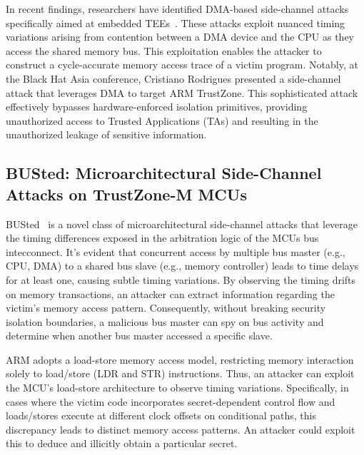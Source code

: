 In recent findings, researchers have identified DMA-based side-channel
attacks specifically aimed at embedded TEEs~\cite{busted, marton}. These
attacks exploit nuanced timing variations arising from contention between a
DMA device and the CPU as they access the shared memory bus. This
exploitation enables the attacker to construct a cycle-accurate memory
access trace of a victim program. Notably, at the Black Hat Asia
conference, Cristiano Rodrigues presented a side-channel attack that
leverages DMA to target ARM TrustZone. This sophisticated attack
effectively bypasses hardware-enforced isolation primitives, providing
unauthorized access to Trusted Applications (\acp{TA}) and resulting in the
unauthorized leakage of sensitive information.

\subsection{BUSted: Microarchitectural Side-Channel Attacks on TrustZone-M MCUs}

BUSted~\cite{busted} is a novel class of microarchitectural side-channel
attacks that leverage the timing differences exposed in the arbitration
logic of the MCUs bus intecconnect. It's evident that concurrent access by
multiple bus master (e.g., CPU, DMA) to a shared bus slave (e.g., memory
controller) leads to time delays for at least one, causing subtle timing
variations. By observing the timing drifts on memory transactions, an
attacker can extract information regarding the victim’s memory access
pattern. Consequently, without breaking security isolation boundaries, a
malicious bus master can spy on bus activity and determine when another bus
master accessed a specific slave.

ARM adopts a load-store memory access model, restricting memory interaction solely to load/store (LDR and STR) instructions. Thus, an attacker can exploit the MCU's load-store architecture to observe timing variations. Specifically, in cases where the victim code incorporates secret-dependent control flow and loads/stores execute at different clock offsets on conditional paths, this discrepancy leads to distinct memory access patterns. An attacker could exploit this to deduce and illicitly obtain a particular secret.

